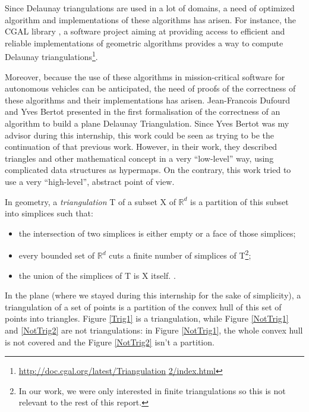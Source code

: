 \documentclass[a4paper,10pt]{article}
\begin{document}
Since Delaunay triangulations are used in a lot of domains, a need of optimized algorithm and implementations of these algorithms has arisen. For instance, the CGAL library \cite{cgal}, a software project aiming at providing access to efficient and reliable implementations of geometric algorithms provides a way to compute Delaunay triangulations\footnote{\href{http://doc.cgal.org/latest/Triangulation_2/index.html}{http://doc.cgal.org/latest/Triangulation$\_$2/index.html}}.

Moreover, because the use of these algorithms in mission-critical software for autonomous vehicles can be anticipated, the need of proofs of the correctness of these algorithms and their implementations has arisen. Jean-Francois Dufourd and Yves Bertot presented in \cite{Bertot} the first formalisation of the correctness of an algorithm to build a plane Delaunay Triangulation. Since Yves Bertot was my advisor during this internship, this work could be seen as trying to be the continuation of that previous work. However, in their work, they described triangles and other mathematical concept in a very ``low-level'' way, using complicated data structures as hypermaps. On the contrary, this work tried to use a very ``high-level'', abstract point of view.

In geometry, a \emph{triangulation} T of a subset X of $\mathbb{R}^d$ is a partition of this subset into simplices such that: 
\begin{itemize}
\item the intersection of two simplices is either empty or a face of those simplices;
\item every bounded set of $\mathbb{R}^{d}$ cuts a finite number of simplices of T\footnote{In our work, we were only interested in finite triangulations so this is not relevant to the rest of this report.};
\item the union of the simplices of T is X itself. \label{deftriangulation}.
\end{itemize}

In the plane (where we stayed during this internship for the sake of simplicity), a triangulation of a set of points is a partition of the convex hull of this set of points into triangles. Figure \ref{Trig1} is a triangulation, while Figure \ref{NotTrig1} and \ref{NotTrig2} are not triangulations: in Figure \ref{NotTrig1}, the whole convex hull is not covered and the Figure \ref{NotTrig2} isn't a partition.
\end{document}
